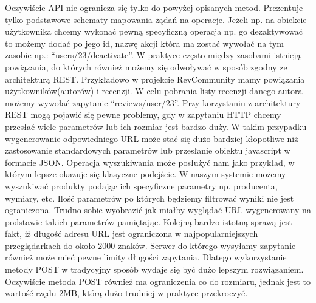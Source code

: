 Oczywiście API nie ogranicza się tylko do powyżej opisanych metod. Prezentuje tylko podstawowe schematy mapowania żądań na operacje. Jeżeli np. na obiekcie użytkownika chcemy wykonać pewną specyficzną operacja np. go dezaktywować to możemy dodać po jego id, nazwę akcji która ma zostać wywołać na tym zasobie np.: “users/23/deactivate”. 
W praktyce często między zasobami istnieją powiązania, do których również możemy się odwoływać w sposób zgodny ze architekturą REST. Przykładowo w projekcie RevCommunity mamy powiązania użytkowników(autorów) i recenzji. W celu pobrania listy recenzji danego autora możemy wywołać zapytanie “reviews/user/23”.
Przy korzystaniu z architektury REST mogą pojawić się pewne problemy, gdy w zapytaniu HTTP chcemy przesłać wiele parametrów lub ich rozmiar jest bardzo duży. W takim przypadku wygenerowanie odpowiedniego URL może stać się dużo bardziej kłopotliwe niż zastosowanie standardowych parametrów lub przesłanie obiektu javascript w formacie JSON. Operacja wyszukiwania może posłużyć nam jako przykład, w którym lepsze okazuje się klasyczne podejście. W naszym systemie możemy wyszukiwać produkty podając ich specyficzne parametry np. producenta, wymiary, etc. Ilość parametrów po których będziemy filtrować wyniki nie jest ograniczona. Trudno sobie wyobrazić jak miałby wyglądać URL wygenerowany na podstawie takich parametrów pamiętając. Kolejną bardzo istotną sprawą jest fakt, iż długość adresu URL jest ograniczona w najpopularniejszych przeglądarkach do około 2000 znaków. Serwer do którego wysyłamy zapytanie również może mieć pewne limity długości zapytania. Dlatego wykorzystanie metody POST w tradycyjny sposób wydaje się być dużo lepszym rozwiązaniem. Oczywiście metoda POST również ma ograniczenia co do rozmiaru, jednak jest to wartość rzędu 2MB, którą dużo trudniej w praktyce przekroczyć.

